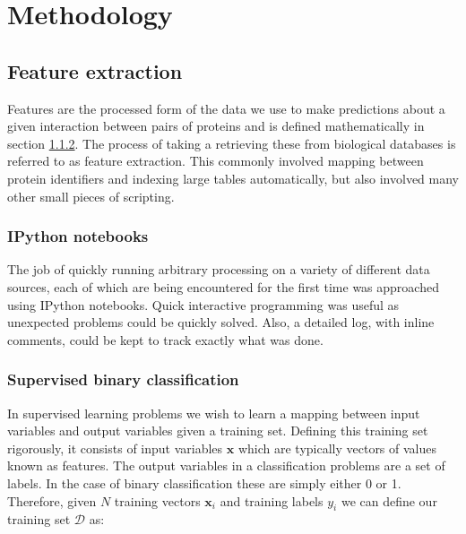 \chapter{Methodology}
\label{methods}



\section{Feature extraction}

Features are the processed form of the data we use to make predictions about a given interaction between pairs of proteins and is defined mathematically in section \ref{supbinclass}.
The process of taking a retrieving these from biological databases is referred to as feature extraction.
This commonly involved mapping between protein identifiers and indexing large tables automatically, but also involved many other small pieces of scripting.

\subsection{IPython notebooks}

The job of quickly running arbitrary processing on a variety of different data sources, each of which are being encountered for the first time was approached using IPython notebooks.
Quick interactive programming was useful as unexpected problems could be quickly solved.
Also, a detailed log, with inline comments, could be kept to track exactly what was done.


\subsection{Supervised binary classification}
\label{supbinclass}

In supervised learning problems we wish to learn a mapping between input variables and output variables given a training set.
Defining this training set rigorously, it consists of input variables $\pmb{x}$ which are typically vectors of values known as features.
The output variables in a classification problems are a set of labels\autocite[2]{murphy_machine_2012}.
In the case of binary classification these are simply either 0 or 1.
Therefore, given $N$ training vectors $\pmb{x}_{i}$ and training labels $y_{i}$ we can define our training set $\mathcal{D}$ as:

